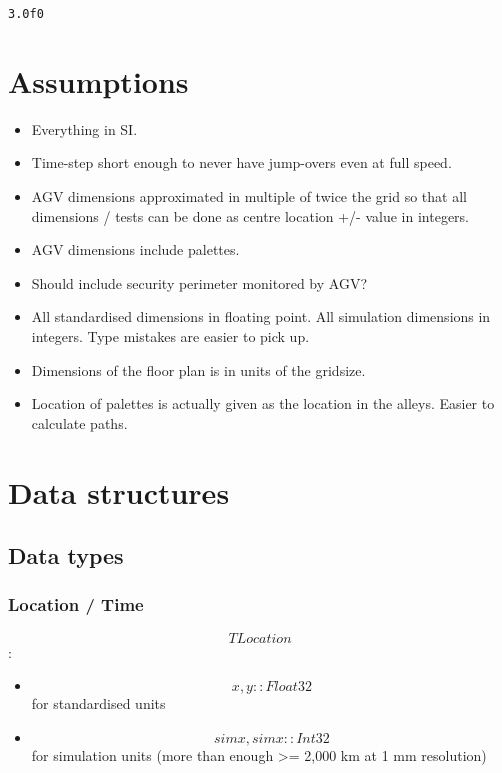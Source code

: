 \documentclass[12pt,a4paper]{article}
\begin{document}
\begin{lstlisting}
3.0f0
\end{lstlisting}


\section{Assumptions}
\begin{itemize}
\item Everything in SI.


\item Time-step short enough to never have jump-overs even at full speed.


\item AGV dimensions approximated in multiple of twice the grid so that all dimensions / tests can be done as centre location +/- value in integers.


\item AGV dimensions include palettes.


\item Should include security perimeter monitored by AGV?


\item All standardised dimensions in floating point. All simulation dimensions in integers. Type mistakes are easier to pick up.


\item Dimensions of the floor plan is in units of the gridsize.


\item Location of palettes is actually given as the location in the alleys. Easier to calculate paths.

\end{itemize}
\section{Data structures}
\subsection{Data types}
\subsubsection{Location / Time}
\[
TLocation
\]
:

\begin{itemize}
\item \[
x, y:: Float32
\]
for standardised units


\item \[
simx, simx::Int32
\]
for simulation units (more than enough >= 2,000 km at 1 mm resolution)

\end{itemize}
\end{document}
